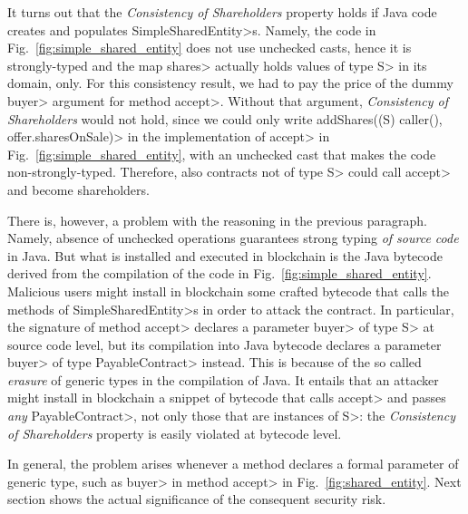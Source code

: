 It turns out that the \emph{Consistency of Shareholders} property holds if Java code
creates and populates \<SimpleSharedEntity>s.
Namely, the code in Fig.~\ref{fig:simple_shared_entity}
does not use unchecked casts, hence it is strongly-typed and
the map \<shares> actually holds values of type \<S> in its domain, only.
For this consistency result, we had to pay the price
of the dummy \<buyer> argument for method \<accept>. Without that argument,
\emph{Consistency of Shareholders} would not hold, since we could only write
\<addShares((S) caller(), offer.sharesOnSale)> in the implementation of \<accept> in
Fig.~\ref{fig:simple_shared_entity}, with an unchecked cast that makes the code
non-strongly-typed. Therefore, also contracts not of type \<S> could call \<accept>
and become shareholders.

There is, however, a problem with the reasoning
in the previous paragraph. Namely, absence of unchecked
operations guarantees strong typing \emph{of source code} in Java. But what is installed
and executed in blockchain is the Java bytecode derived from
the compilation of the code in Fig.~\ref{fig:simple_shared_entity}.
Malicious users might install in blockchain some crafted bytecode that
calls the methods of \<SimpleSharedEntity>s in order to attack
the contract. In particular,
the signature of method \<accept> declares a parameter \<buyer> of type \<S> at source code level, but
its compilation into Java bytecode declares a parameter \<buyer> of type \<PayableContract> instead.
This is because of the so called \emph{erasure} of generic types in the compilation of Java.
It entails that an attacker might install in blockchain a snippet of bytecode that calls
\<accept> and passes \emph{any} \<PayableContract>, not only those that are instances of \<S>:
the \emph{Consistency of Shareholders} property is easily violated at bytecode level.

In general, the problem arises whenever a method declares a formal parameter of generic type,
such as \<buyer> in method \<accept> in Fig.~\ref{fig:shared_entity}. Next section shows
the actual significance of the consequent security risk.

